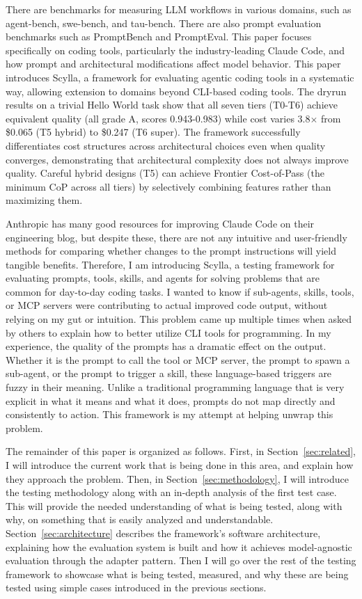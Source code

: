 \documentclass[11pt]{article}
\begin{document}
There are benchmarks for measuring LLM workflows in various domains, such as
agent-bench\cite{liu2023agentbench}, swe-bench\cite{jimenez2024swebench}, and tau-bench\cite{yao2024taubench}. There are also prompt
evaluation benchmarks such as PromptBench\cite{zhu2024promptbench} and PromptEval\cite{polo2024efficient}. This paper
focuses specifically on coding tools, particularly the industry-leading Claude
Code\cite{anthropic2024claude}, and how prompt and architectural modifications affect model behavior.
This paper introduces Scylla, a framework for evaluating agentic coding tools in
a systematic way, allowing extension to domains beyond CLI-based coding tools.
The dryrun results on a trivial Hello World task show that all seven tiers
(T0-T6) achieve equivalent quality (all grade A, scores 0.943-0.983) while cost
varies 3.8$\times$ from \$0.065 (T5 hybrid) to \$0.247 (T6 super). The framework
successfully differentiates cost structures across architectural choices even
when quality converges, demonstrating that architectural complexity does not
always improve quality. Careful hybrid designs (T5) can achieve Frontier
Cost-of-Pass (the minimum CoP across all tiers) by selectively combining features rather than maximizing them.

Anthropic has many good resources for improving Claude Code on their engineering
blog, but despite these, there are not any intuitive and user-friendly methods
for comparing whether changes to the prompt instructions will yield tangible
benefits. Therefore, I am introducing Scylla, a testing framework for evaluating
prompts, tools, skills, and agents for solving problems that are common for
day-to-day coding tasks. I wanted to know if sub-agents, skills, tools, or MCP
servers were contributing to actual improved code output, without relying on my
gut or intuition. This problem came up multiple times when asked by others to
explain how to better utilize CLI tools for programming. In my experience, the
quality of the prompts has a dramatic effect on the output.
Whether it is the prompt to call the tool or MCP server, the prompt to spawn a
sub-agent, or the prompt to trigger a skill, these language-based triggers are
fuzzy in their meaning. Unlike a traditional programming language that is very
explicit in what it means and what it does, prompts do not map directly and
consistently to action. This framework is my attempt at helping unwrap this
problem.

The remainder of this paper is organized as follows. First, in Section~\ref{sec:related}, I will introduce the current work that is being done in
this area, and explain how they approach the problem. Then, in Section~\ref{sec:methodology}, I will
introduce the testing methodology along with an in-depth analysis of the first
test case. This will provide the needed understanding of what is being tested,
along with why, on something that is easily analyzed and
understandable. Section~\ref{sec:architecture} describes the framework's software architecture, explaining how the evaluation system is built and how it achieves model-agnostic evaluation through the adapter pattern. Then I will go over the rest of the testing framework to
showcase what is being tested, measured, and why these are being tested using
simple cases introduced in the previous sections.
\end{document}
